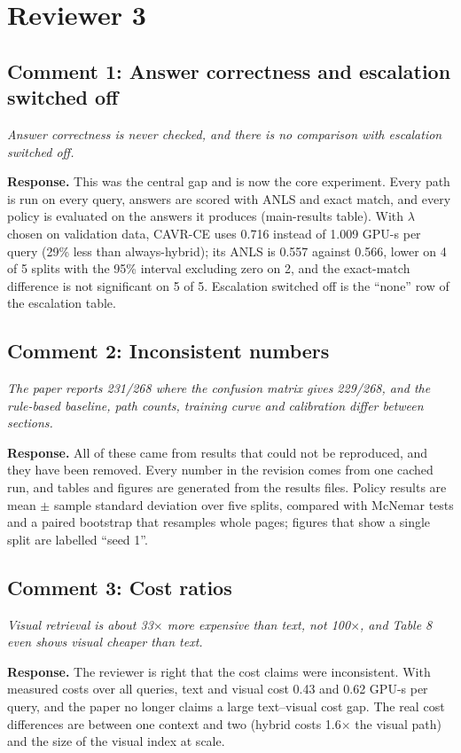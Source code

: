 \documentclass[11pt]{article}
\newcommand{\reviewer}[1]{{\color{blue!55!black}\itshape #1\par}}
\begin{document}
\section*{Reviewer 3}
\subsection*{Comment 1: Answer correctness and escalation switched off}
\reviewer{Answer correctness is never checked, and there is no comparison with escalation switched off.}
\textbf{Response.} This was the central gap and is now the core experiment. Every path is run on every query, answers are scored with ANLS and exact match, and every policy is evaluated on the answers it produces (main-results table). With $\lambda$ chosen on validation data, CAVR-CE uses 0.716 instead of 1.009 GPU-s per query (29\% less than always-hybrid); its ANLS is 0.557 against 0.566, lower on 4 of 5 splits with the 95\% interval excluding zero on 2, and the exact-match difference is not significant on 5 of 5. Escalation switched off is the ``none'' row of the escalation table.

\subsection*{Comment 2: Inconsistent numbers}
\reviewer{The paper reports 231/268 where the confusion matrix gives 229/268, and the rule-based baseline, path counts, training curve and calibration differ between sections.}
\textbf{Response.} All of these came from results that could not be reproduced, and they have been removed. Every number in the revision comes from one cached run, and tables and figures are generated from the results files. Policy results are mean $\pm$ sample standard deviation over five splits, compared with McNemar tests and a paired bootstrap that resamples whole pages; figures that show a single split are labelled ``seed 1''.

\subsection*{Comment 3: Cost ratios}
\reviewer{Visual retrieval is about 33$\times$ more expensive than text, not 100$\times$, and Table 8 even shows visual cheaper than text.}
\textbf{Response.} The reviewer is right that the cost claims were inconsistent. With measured costs over all queries, text and visual cost 0.43 and 0.62 GPU-s per query, and the paper no longer claims a large text--visual cost gap. The real cost differences are between one context and two (hybrid costs 1.6$\times$ the visual path) and the size of the visual index at scale.
\end{document}
